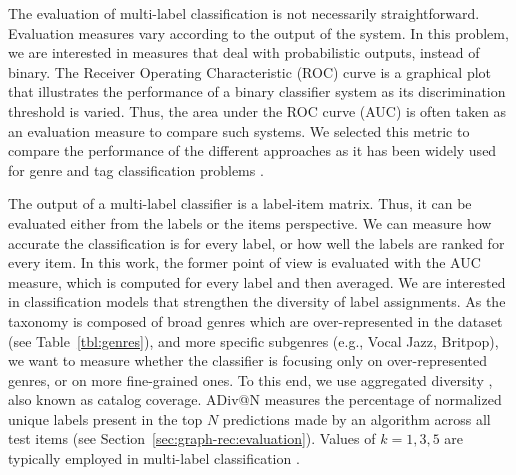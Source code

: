 The evaluation of multi-label classification is not necessarily straightforward. 
Evaluation measures vary according to the output of the system. 
In this problem, we are interested in measures that deal with probabilistic outputs, instead of binary. 
The Receiver Operating Characteristic (ROC) curve is a graphical plot that illustrates the performance of a binary classifier system as its discrimination threshold is varied. 
Thus, the area under the ROC curve (AUC) is often taken as an evaluation measure to compare such systems. 
We selected this metric to compare the performance of the different approaches as it has been widely used for genre and tag classification problems \citep{Choi2016,dieleman2014end}. 

The output of a multi-label classifier is a label-item matrix. 
Thus, it can be evaluated either from the labels or the items perspective. 
We can measure how accurate the classification is for every label, or how well the labels are ranked for every item. 
In this work, the former point of view is evaluated with the AUC measure, which is computed for every label and then averaged. 
We are interested in classification models that strengthen the diversity of label assignments. 
As the taxonomy is composed of broad genres which are over-represented in the dataset (see Table~\ref{tbl:genres}), and more specific subgenres (e.g., Vocal Jazz, Britpop), we want to measure whether the classifier is focusing only on over-represented genres, or on more fine-grained ones.
To this end, we use aggregated diversity \citep{AdomaviciusK12}, also known as catalog coverage.%
ADiv@N measures the percentage of normalized unique labels present in the top $N$ predictions made by an algorithm across all test items (see Section~\ref{sec:graph-rec:evaluation}). Values of $k = 1, 3, 5$ are typically employed in multi-label classification \citep{jain2016extreme} .

